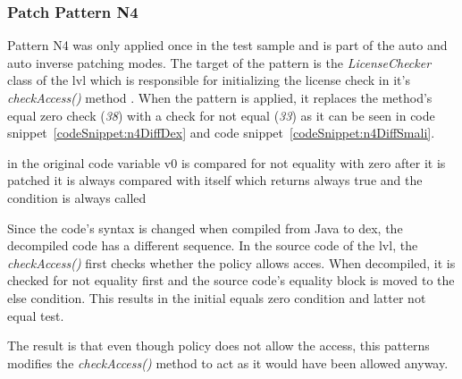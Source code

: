 \subsubsection{Patch Pattern N4}
Pattern N4 was only applied once in the test sample and is part of the auto and auto inverse patching modes.
The target of the pattern is the \textit{LicenseChecker} class of the \gls{lvl} which is responsible for initializing the license check in it's \textit{checkAccess()} method \cite{developersLicensingReference}.
\newline
When the pattern is applied, it replaces the method's equal zero check (\textit{38}) with a check for not equal (\textit{33}) as it can be seen in code snippet~\ref{codeSnippet:n4DiffDex} and code snippet~\ref{codeSnippet:n4DiffSmali}.
\newline



in the original code variable v0 is compared for not equality with zero
after it is patched it is always compared with itself which returns always true and the condition is always called

Since the code's syntax is changed when compiled from Java to dex, the decompiled code has a different sequence.
In the source code of the \gls{lvl}, the \textit{checkAccess()} first checks whether the policy allows acces.
When decompiled, it is checked for not equality first and the source code's equality block is moved to the else condition.
This results in the initial equals zero condition and latter not equal test.



The result is that even though policy does not allow the access, this patterns modifies the \textit{checkAccess()} method to act as it would have been allowed anyway.


